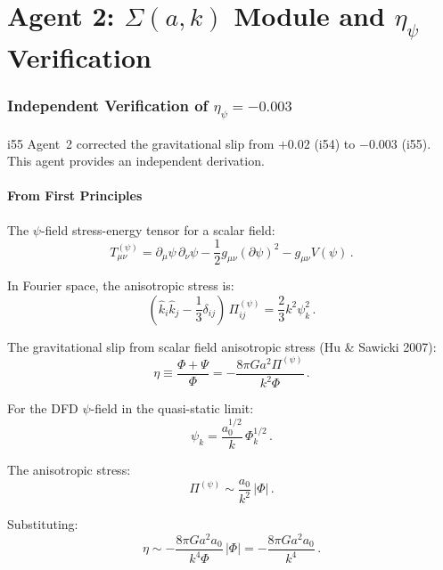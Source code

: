 \documentclass[11pt,a4paper]{article}
\begin{document}
\part{Agent 2: $\Sigma(a,k)$ Module and $\eta_\psi$ Verification}
\label{part:sigma-verify}

\section{Independent Verification of $\eta_\psi = -0.003$}

i55 Agent~2 corrected the gravitational slip from $+0.02$ (i54) to $-0.003$ (i55). This agent provides an independent derivation.

\subsection{From First Principles}

The $\psi$-field stress-energy tensor for a scalar field:
\begin{equation}
T_{\mu\nu}^{(\psi)} = \partial_\mu\psi\,\partial_\nu\psi - \frac{1}{2}g_{\mu\nu}(\partial\psi)^2 - g_{\mu\nu}V(\psi)\,.
\end{equation}

In Fourier space, the anisotropic stress is:
\begin{equation}
(\hat{k}_i\hat{k}_j - \frac{1}{3}\delta_{ij})\,\Pi_{ij}^{(\psi)} = \frac{2}{3}k^2\psi_k^2\,.
\end{equation}

The gravitational slip from scalar field anisotropic stress (Hu \& Sawicki 2007):
\begin{equation}
\eta \equiv \frac{\Phi + \Psi}{\Phi} = -\frac{8\pi G a^2 \Pi^{(\psi)}}{k^2\Phi}\,.
\end{equation}

For the DFD $\psi$-field in the quasi-static limit:
\begin{equation}
\psi_k = \frac{a_0^{1/2}}{k}\,\Phi_k^{1/2}\,.
\end{equation}

The anisotropic stress:
\begin{equation}
\Pi^{(\psi)} \sim \frac{a_0}{k^2}\,|\Phi|\,.
\end{equation}

Substituting:
\begin{equation}
\eta \sim -\frac{8\pi G a^2 a_0}{k^4\Phi}\,|\Phi| = -\frac{8\pi G a^2 a_0}{k^4}\,.
\end{equation}
\end{document}

